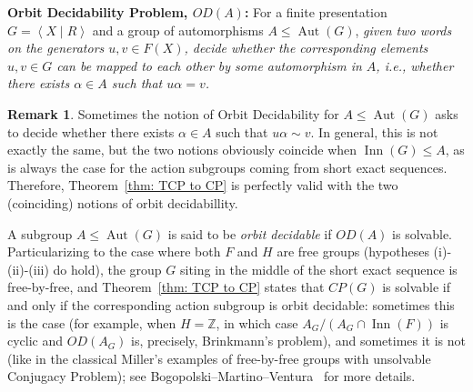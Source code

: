 \documentclass[english]{amsart}
\theoremstyle{definition}
\newtheorem{rem}[thm]{Remark}
\newcommand\ZZ{\mathbb{Z}}
\newcommand{\Aut}{\operatorname{Aut}}
\newcommand{\Inn}{\operatorname{Inn}}
\newcommand{\pres}[2]{\left\langle#1 \mid #2\right\rangle}
\begin{document}
\noindent \textbf{\boldmath Orbit Decidability Problem, $OD(A)$:} For a finite presentation $G=\pres{X}{R}$ and a group of automorphisms $A\leqslant \Aut(G)$, \emph{given two words on the generators $u,v\in F(X)$, decide whether the corresponding elements $u,v\in G$ can be mapped to each other by some automorphism in $A$, i.e., whether there exists $\alpha \in A$ such that $u\alpha =v$.}

\begin{rem}
Sometimes the notion of Orbit Decidability for $A\leqslant \Aut(G)$ asks to decide whether there exists $\alpha \in A$ such that $u\alpha \sim v$. In general, this is not exactly the same, but the two notions obviously coincide when $\Inn(G)\leqslant A$, as is always the case for the action subgroups coming from short exact sequences. Therefore, Theorem~\ref{thm: TCP to CP} is perfectly valid with the two (coinciding) notions of orbit decidabillity. \end{rem}

A subgroup $A\leqslant \Aut(G)$ is said to be \emph{orbit decidable} if $OD(A)$ is solvable. Particularizing to the case where both $F$ and $H$ are free groups (hypotheses (i)-(ii)-(iii) do hold), the group $G$ siting in the middle of the short exact sequence is free-by-free, and Theorem~\ref{thm: TCP to CP} states that $CP(G)$ is solvable if and only if the corresponding action subgroup is orbit decidable: sometimes this is the case (for example, when $H=\ZZ$, in which case $A_G/(A_G\cap \Inn(F))$ is cyclic and $OD(A_G)$ is, precisely, Brinkmann's problem), and sometimes it is not (like in the classical Miller's examples of free-by-free groups with unsolvable Conjugacy Problem); see Bogopolski--Martino--Ventura~\cite{BMV} for more details. 
\end{document}
